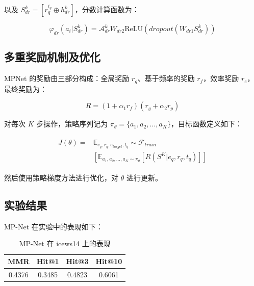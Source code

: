\documentclass[a4paper, AutoFakeBold]{article}
\begin{document}
以及 $S_{dr}^k=[r_q^{t_q}\oplus h^k_{dr}]$，分数计算函数为：

\begin{equation}
\varphi_{dr}(a_i|S^k_{dr})={\mathcal A}_{dr}^k W_{dr2}\text{ReLU}(dropout(W_{dr1}S^k_{dr}))
\end{equation}


\subsection{多重奖励机制及优化}

MPNet 的奖励由三部分构成：全局奖励 $r_g$、基于频率的奖励 $r_f$，效率奖励 $r_e$，最终奖励为：

\begin{equation}
R=(1+\alpha_1 r_f)(r_g+\alpha_2 r_p)
\end{equation}

对每次 $K$ 步操作，策略序列记为 $\pi_{\theta}=\{a_1,a_2,\dots,a_K\}$，目标函数定义如下：

\begin{equation}
\begin{aligned}
	\begin{split}
		J(\theta)= & {\mathbb E}_{e_q,r_q,e_{target},t_q}\sim{\mathcal F}_{train}\\
		& [{\mathbb E}_{a_1,a_2,\dots,a_K\sim\pi_{\theta}}[R(S^K|e_q,r_q,t_q)]]
	\end{split}
\end{aligned}
\end{equation}

然后使用策略梯度方法进行优化，对 $\theta$ 进行更新。

\subsection{实验结果}

MP-Net 在实验中的表现如下：




\begin{table}[htbp]
	\centering
	\caption{MP-Net 在 icews14 上的表现}
	\begin{tabular}{cccc}
		\toprule  %
		MMR&Hit@1&Hit@3&Hit@10 \\ 
		\midrule  %
		0.4376&0.3485&0.4823&0.6061 \\
		\bottomrule  %
	\end{tabular}
\end{table}
\end{document}
